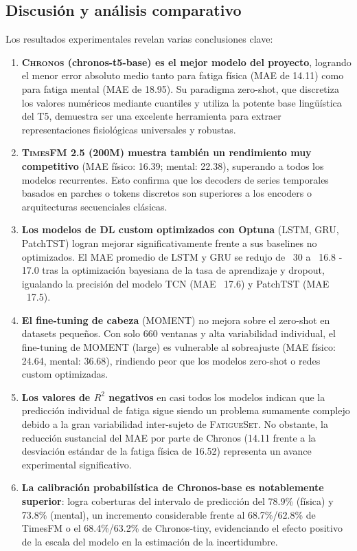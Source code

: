 \documentclass[12pt, a4paper]{article}
\newcommand{\fatigueset}{\textsc{FatigueSet}}
\newcommand{\moment}{\textsc{MOMENT}}
\newcommand{\chronos}{\textsc{Chronos}}
\newcommand{\timesfm}{\textsc{TimesFM}}
\begin{document}
\subsection{Discusión y análisis comparativo}

Los resultados experimentales revelan varias conclusiones clave:

\begin{enumerate}
    \item \textbf{\chronos{} (chronos-t5-base) es el mejor modelo del proyecto}, logrando el menor error absoluto medio tanto para fatiga física (MAE de 14.11) como para fatiga mental (MAE de 18.95). Su paradigma zero-shot, que discretiza los valores numéricos mediante cuantiles y utiliza la potente base lingüística del T5, demuestra ser una excelente herramienta para extraer representaciones fisiológicas universales y robustas.
    
    \item \textbf{\timesfm{} 2.5 (200M) muestra también un rendimiento muy competitivo} (MAE físico: 16.39; mental: 22.38), superando a todos los modelos recurrentes. Esto confirma que los decoders de series temporales basados en parches o tokens discretos son superiores a los encoders o arquitecturas secuenciales clásicas.
    
    \item \textbf{Los modelos de DL custom optimizados con Optuna} (LSTM, GRU, PatchTST) logran mejorar significativamente frente a sus baselines no optimizados. El MAE promedio de LSTM y GRU se redujo de ~30 a ~16.8 - 17.0 tras la optimización bayesiana de la tasa de aprendizaje y dropout, igualando la precisión del modelo TCN (MAE ~17.6) y PatchTST (MAE ~17.5).
    
    \item \textbf{El fine-tuning de cabeza} (\moment{}) no mejora sobre el zero-shot en datasets pequeños. Con solo 660 ventanas y alta variabilidad individual, el fine-tuning de MOMENT (large) es vulnerable al sobreajuste (MAE físico: 24.64, mental: 36.68), rindiendo peor que los modelos zero-shot o redes custom optimizadas.
    
    \item \textbf{Los valores de $R^2$ negativos} en casi todos los modelos indican que la predicción individual de fatiga sigue siendo un problema sumamente complejo debido a la gran variabilidad inter-sujeto de \fatigueset{}. No obstante, la reducción sustancial del MAE por parte de Chronos (14.11 frente a la desviación estándar de la fatiga física de 16.52) representa un avance experimental significativo.
    
    \item \textbf{La calibración probabilística de Chronos-base es notablemente superior}: logra coberturas del intervalo de predicción del 78.9\% (física) y 73.8\% (mental), un incremento considerable frente al 68.7\%/62.8\% de TimesFM o el 68.4\%/63.2\% de Chronos-tiny, evidenciando el efecto positivo de la escala del modelo en la estimación de la incertidumbre.
\end{enumerate}
\end{document}
